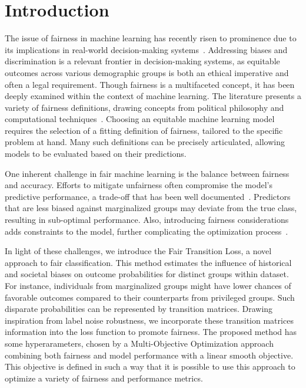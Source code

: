 \chapter{Introduction}

The issue of fairness in machine learning has recently risen to prominence due to its implications in real-world decision-making systems~\citep{Mehrabi2019,Hutchinson2019}. Addressing biases and discrimination is a relevant frontier in decision-making systems, as equitable outcomes across various demographic groups is both an ethical imperative and often a legal requirement. Though fairness is a multifaceted concept, it has been deeply examined within the context of machine learning. The literature presents a variety of fairness definitions, drawing concepts from political philosophy and computational techniques~\citep{caton2023, Hutchinson2019}. Choosing an equitable machine learning model requires the selection of a fitting definition of fairness, tailored to the specific problem at hand. Many such definitions can be precisely articulated, allowing models to be evaluated based on their predictions.

One inherent challenge in fair machine learning is the balance between fairness and accuracy. Efforts to mitigate unfairness often compromise the model's predictive performance, a trade-off that has been well documented~\citep{Mehrabi2019, caton2023}. Predictors that are less biased against marginalized groups may deviate from the true class, resulting in sub-optimal performance. Also, introducing fairness considerations adds constraints to the model, further complicating the optimization process~\citep{Zafar2017b}. 

In light of these challenges, we introduce the Fair Transition Loss, a novel approach to fair classification. This method estimates the influence of historical and societal biases on outcome probabilities for distinct groups within dataset. For instance, individuals from marginalized groups might have lower chances of favorable outcomes compared to their counterparts from privileged groups. Such disparate probabilities can be represented by transition matrices. Drawing inspiration from label noise robustness, we incorporate these transition matrices information into the loss function to promote fairness. The proposed method has some hyperarameters, chosen by a Multi-Objective Optimization approach combining both fairness and model performance with a linear smooth objective. This objective is defined in such a way that it is possible to use this approach to optimize a variety of fairness and performance metrics.

